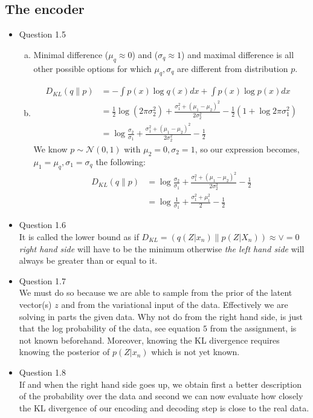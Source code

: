 \documentclass{article}
\begin{document}
  \subsection{The encoder}
    \begin{itemize}
      \item Question 1.5
      \begin{enumerate}[(a)]
        \item Minimal difference ($\mu_q \approx 0$) and ($\sigma_q \approx 1$) and maximal difference is all other possible options for which $\mu_q, \sigma_q $ are different from distribution $p$. 
        \item
         \begin{align*}
           D_{KL}(q\|p) &=-\int p(x) \log q(x) d x+\int p(x) \log p(x) d x \\ 
           &=\frac{1}{2} \log \left(2 \pi \sigma_{2}^{2}\right)+\frac{\sigma_{1}^{2}+\left(\mu_{1}-\mu_{2}\right)^{2}}{2 \sigma_{2}^{2}}-\frac{1}{2}\left(1+\log 2 \pi \sigma_{1}^{2}\right) \\ 
           &=\log \frac{\sigma_{2}}{\sigma_{1}}+\frac{\sigma_{1}^{2}+\left(\mu_{1}-\mu_{2}\right)^{2}}{2 \sigma_{2}^{2}}-\frac{1}{2} 
        \end{align*}
        We know $p \sim \mathcal{N}(0, 1) $ with $\mu_2 = 0, \sigma_2 = 1$, so our expression becomes, $\mu_1 = \mu_q, \sigma_1 = \sigma_q$ the following: 
        \begin{align*}
          D_{KL}(q\|p ) &= \log \frac{\sigma_{2}}{\sigma_{1}}+\frac{\sigma_{1}^{2}+\left(\mu_{1}-\mu_{2}\right)^{2}}{2 \sigma_{2}^{2}}-\frac{1}{2} \\
          &= \log \frac{1}{\sigma_{1}}+\frac{\sigma_{1}^{2}+\mu_{1}^{2}}{2 }-\frac{1}{2}
        \end{align*}
      \end{enumerate}
      \item Question 1.6 \\
      It is called the lower bound as if $D_{KL} =( q(Z |x_n)\| p(Z| X_n)) \approx \vee = 0$  \textit{right hand side} will have to be the minimum otherwise \textit{the left hand side } will always be greater than or equal to it.  
      \item Question 1.7 \\
      We must do so because we are able to sample from the prior of the latent vector(s) $z$ and from the variational input of the data. Effectively we are solving in parts the given data. Why not do from the right hand side, is just that the log probability of the data, see equation $5$ from the assignment, is not known beforehand. Moreover, knowing the KL divergence requires knowing the posterior of $p(Z|x_n)$ which is not yet known. 
      \item Question 1.8 \\
      If and when the right hand side goes up, we obtain first a better description of the probability over the data and second we can now evaluate how closely the KL divergence of our encoding and decoding step is close to the real data.  
    \end{itemize}
\end{document}
